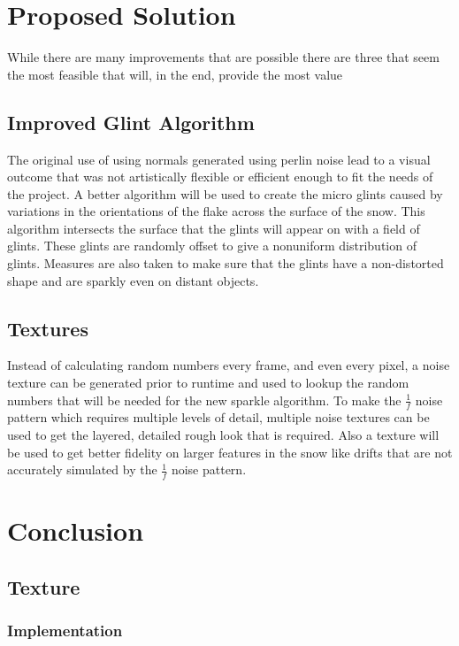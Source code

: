 \documentclass{IEEEtran}
\begin{document}
\section{Proposed Solution}

While there are many improvements that are possible there are three that seem
the most feasible that will, in the end, provide the most value

\subsection{Improved Glint Algorithm}

The original use of using normals generated using perlin noise lead to a visual
outcome that was not artistically flexible or efficient enough to fit the needs of the
project. A better algorithm \cite{sparkle} will be used to
create the micro glints caused by variations in the orientations of the flake
across the surface of the snow. This algorithm intersects the surface that the
glints will appear on with a field of glints. These glints are randomly offset
to give a nonuniform distribution of glints. Measures are also taken to make
sure that the glints have a non-distorted shape and are sparkly even on distant
objects.

\subsection{Textures}

Instead of calculating random numbers every frame, and even every pixel, a noise
texture can be generated prior to runtime and used to lookup the random numbers
that will be needed for the new sparkle algorithm. To make the \(\frac{1}{f}\) noise
pattern which requires multiple levels of detail, multiple noise textures can be
used to get the layered, detailed rough look that is required. Also a texture
will be used to get better fidelity on larger features in the snow like drifts that
are not accurately simulated by the \(\frac{1}{f}\) noise pattern.

\section{Conclusion}

\subsection{Texture}

\subsubsection{Implementation}
\end{document}
